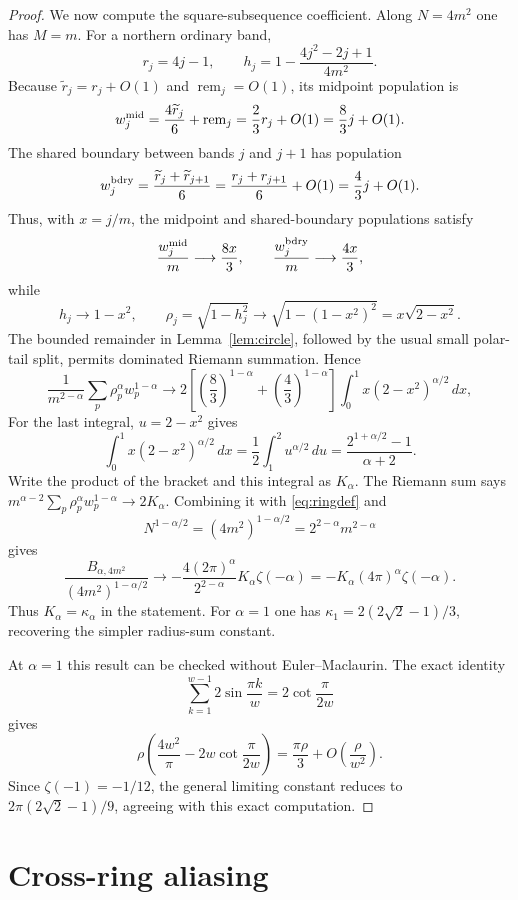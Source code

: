\documentclass[11pt]{amsart}
\begin{document}
\begin{proof}
We now compute the square-subsequence coefficient.  Along $N=4m^2$ one has
$M=m$.  For a northern ordinary band,
\[
 r_j=4j-1,\qquad
 h_j=1-\frac{4j^2-2j+1}{4m^2}.
\]
Because $\widetilde r_j=r_j+O(1)$ and
$\operatorname{rem}_j=O(1)$, its midpoint population is
\[
 w_j^{\rm mid}
 =\frac{4\widetilde r_j}{6}+\operatorname{rem}_j
 =\frac23r_j+O(1)=\frac83j+O(1).
\]
The shared boundary between bands $j$ and $j+1$ has population
\[
 w_j^{\rm bdry}
 =\frac{\widetilde r_j+\widetilde r_{j+1}}6
 =\frac{r_j+r_{j+1}}6+O(1)
 =\frac43j+O(1).
\]
Thus, with $x=j/m$, the midpoint and shared-boundary populations satisfy
\[
 \frac{w_j^{\rm mid}}m\longrightarrow\frac{8x}{3},
 \qquad
 \frac{w_j^{\rm bdry}}m\longrightarrow\frac{4x}{3},
\]
while
\[
 h_j\longrightarrow1-x^2,\qquad
 \rho_j=\sqrt{1-h_j^2}\longrightarrow
 \sqrt{1-(1-x^2)^2}=x\sqrt{2-x^2}.
\]
The bounded remainder in
Lemma~\ref{lem:circle}, followed by the usual small polar-tail split, permits
dominated Riemann summation.  Hence
\[
 \frac1{m^{2-\alpha}}
 \sum_p\rho_p^\alpha w_p^{1-\alpha}
 \longrightarrow
 2\left[\left(\frac83\right)^{1-\alpha}
        +\left(\frac43\right)^{1-\alpha}\right]
 \int_0^1x(2-x^2)^{\alpha/2}\,dx,
\]
For the last integral, $u=2-x^2$ gives
\[
 \int_0^1x(2-x^2)^{\alpha/2}\,dx
 =\frac12\int_1^2u^{\alpha/2}\,du
 =\frac{2^{1+\alpha/2}-1}{\alpha+2}.
\]
Write the product of the bracket and this integral as $K_\alpha$.  The
Riemann sum says
$m^{\alpha-2}\sum_p\rho_p^\alpha w_p^{1-\alpha}\to2K_\alpha$.
Combining it with \eqref{eq:ringdef} and
\[
 N^{1-\alpha/2}
 =(4m^2)^{1-\alpha/2}=2^{2-\alpha}m^{2-\alpha}
\]
gives
\[
 \frac{B_{\alpha,4m^2}}{(4m^2)^{1-\alpha/2}}
 \longrightarrow
 -\frac{4(2\pi)^\alpha}{2^{2-\alpha}}
 K_\alpha\zeta(-\alpha)
 =-K_\alpha(4\pi)^\alpha\zeta(-\alpha).
\]
Thus $K_\alpha=\kappa_\alpha$ in the statement.
For $\alpha=1$ one has
$\kappa_1=2(2\sqrt2-1)/3$, recovering the simpler radius-sum constant.

At $\alpha=1$ this result can be checked without Euler--Maclaurin.  The exact
identity
\[
 \sum_{k=1}^{w-1}2\sin\frac{\pi k}{w}
 =2\cot\frac{\pi}{2w}
\]
gives
\[
 \rho\left(\frac{4w^2}{\pi}-2w\cot\frac{\pi}{2w}\right)
 =\frac{\pi\rho}{3}+O\!\left(\frac{\rho}{w^2}\right).
\]
Since $\zeta(-1)=-1/12$, the general limiting constant reduces to
$2\pi(2\sqrt2-1)/9$, agreeing with this exact computation.
\end{proof}

\section{Cross-ring aliasing}
\end{document}
